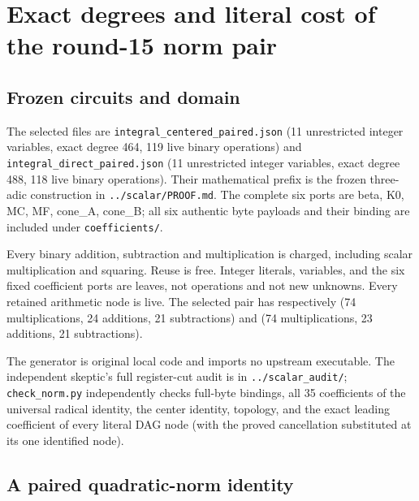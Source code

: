 \section{Exact degrees and literal cost of the round-15 norm pair}



\subsection*{Frozen circuits and domain}



The selected files are \texttt{integral\_\allowbreak{}centered\_\allowbreak{}paired.json} (11 unrestricted integer variables, exact degree 464, 119 live binary operations) and \texttt{integral\_\allowbreak{}direct\_\allowbreak{}paired.json} (11 unrestricted integer variables, exact degree 488, 118 live binary operations). Their mathematical prefix is the frozen three-adic construction in \texttt{../\allowbreak{}scalar/\allowbreak{}PROOF.md}. The complete six ports are beta, K0, MC, MF, cone\_\allowbreak{}A, cone\_\allowbreak{}B; all six authentic byte payloads and their binding are included under \texttt{coefficients/\allowbreak{}}.



Every binary addition, subtraction and multiplication is charged, including scalar multiplication and squaring. Reuse is free. Integer literals, variables, and the six fixed coefficient ports are leaves, not operations and not new unknowns. Every retained arithmetic node is live. The selected pair has respectively (74 multiplications, 24 additions, 21 subtractions) and (74 multiplications, 23 additions, 21 subtractions).



The generator is original local code and imports no upstream executable. The independent skeptic's full register-cut audit is in \texttt{../\allowbreak{}scalar\_\allowbreak{}audit/\allowbreak{}}; \texttt{check\_\allowbreak{}norm.py} independently checks full-byte bindings, all 35 coefficients of the universal radical identity, the center identity, topology, and the exact leading coefficient of every literal DAG node (with the proved cancellation substituted at its one identified node).



\subsection*{A paired quadratic-norm identity}



